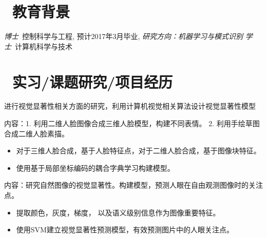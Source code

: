 \documentclass{resume}
\begin{document}


 
\section{\faGraduationCap\  教育背景}\small
{}
\textit{博士}\ 控制科学与工程, 预计2017年3月毕业, \textit{研究方向：机器学习与模式识别}
\textit{学士}\ 计算机科学与技术

\section{\faUsers\ 实习/课题研究/项目经历}\small
{}
进行视觉显著性相关方面的研究，利用计算机视觉相关算法设计视觉显著性模型

\begin{onehalfspacing}
	内容：1. 利用二维人脸图像合成三维人脸模型，构建不同表情。 2. 利用手绘草图合成二维人脸素描。
	\begin{itemize}
		\item 对于三维人脸合成，基于人脸特征点，对于二维人脸合成，基于图像块特征。
		\item 使用基于局部坐标编码的耦合字典学习构建模型。
	\end{itemize}


\end{onehalfspacing}

\begin{onehalfspacing}
内容：研究自然图像的视觉显著性。构建模型，预测人眼在自由观测图像时的关注点。
\begin{itemize}
  \item 提取颜色，灰度，梯度， 以及语义级别信息作为图像重要特征。
  \item 使用SVM建立视觉显著性预测模型，有效预测图片中的人眼关注点。
\end{itemize}
\end{onehalfspacing}
\end{document}
